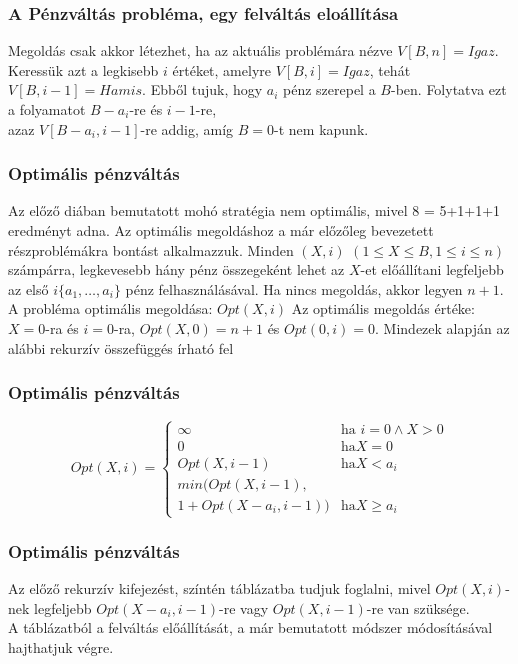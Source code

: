 \documentclass{beamer}
\begin{document}
\begin{frame}
    \frametitle{A Pénzváltás probléma, egy felváltás eloállítása}
    Megoldás csak akkor létezhet, ha az aktuális problémára nézve \(V[B,n]=Igaz\). \newline
    Keressük azt a legkisebb \(i\) értéket, amelyre \(V[B,i]=Igaz\), tehát $V[B,i-1]=Hamis$. \newline
    Ebből tujuk, hogy \(a_i\) pénz szerepel a \(B\)-ben.\newline
    Folytatva ezt a folyamatot \(B-a_i\)-re és \(i-1\)-re,\\ azaz $V[B-a_i,i-1]$-re addig, amíg $B=0$-t nem kapunk.
\end{frame}
\begin{frame}
    \frametitle{Optimális pénzváltás}
    Az előző diában bemutatott mohó stratégia nem optimális, mivel 8 = 5+1+1+1 eredményt adna.\newline
    Az optimális megoldáshoz a már előzőleg bevezetett részproblémákra bontást alkalmazzuk.\newline
    Minden \((X,i)\) \((1 \leq X \leq B, 1 \leq i \leq n)\) számpárra,\newline
    legkevesebb hány pénz összegeként lehet az \(X\)-et előállítani \newline
    legfeljebb az első \(i\{a_1,\dots,a_i\}\) pénz felhasználásával.
    Ha nincs megoldás, akkor legyen \(n+1\).\newline
    A probléma optimális megoldása: \(Opt(X,i)\)
    Az optimális megoldás értéke: \(X=0\)-ra és \(i=0\)-ra, \(Opt(X,0)=n+1\) és \(Opt(0,i)=0\).
    Mindezek alapján az alábbi rekurzív összefüggés írható fel
\end{frame}
\begin{frame}
    \frametitle{Optimális pénzváltás}
    \[
        Opt(X,i) =
    \begin{cases}
        \infty & \text{ha } i=0\wedge X>0 \\
        0 &\text{ha} X=0 \\
        Opt(X,i-1)& \text{ha} X<a_i \\
        min(Opt(X,i-1),\\1+Opt(X-a_i,i-1))& \text{ha} X \ge a_i
    \end{cases}
    \]
\end{frame}
\begin{frame}
    \frametitle{Optimális pénzváltás}
    Az előző rekurzív kifejezést, színtén táblázatba tudjuk foglalni, mivel $Opt(X,i)$-nek legfeljebb $Opt(X-a_i,i-1)$-re vagy $Opt(X,i-1)$-re van szüksége.\\
    A táblázatból a felváltás előállítását, a már bemutatott módszer módosításával hajthatjuk végre.
\end{frame}
\end{document}
